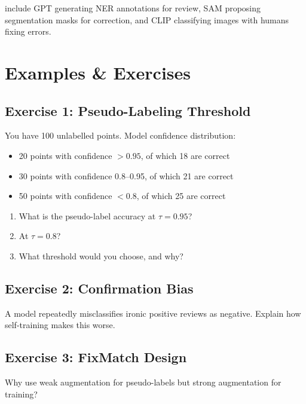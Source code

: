  include GPT generating NER annotations for review, SAM proposing segmentation masks for correction, and CLIP classifying images with humans fixing errors.



\newpage
\section{Examples \& Exercises}

\subsection{Exercise 1: Pseudo-Labeling Threshold}

You have 100 unlabelled points. Model confidence distribution:
\begin{itemize}
    \item 20 points with confidence $> 0.95$, of which 18 are correct
    \item 30 points with confidence 0.8--0.95, of which 21 are correct
    \item 50 points with confidence $< 0.8$, of which 25 are correct
\end{itemize}

\begin{enumerate}
    \item What is the pseudo-label accuracy at $\tau = 0.95$?
    \item At $\tau = 0.8$?
    \item What threshold would you choose, and why?
\end{enumerate}

\subsection{Exercise 2: Confirmation Bias}

A model repeatedly misclassifies ironic positive reviews as negative. Explain how self-training makes this worse.

\subsection{Exercise 3: FixMatch Design}

Why use weak augmentation for pseudo-labels but strong augmentation for training?


